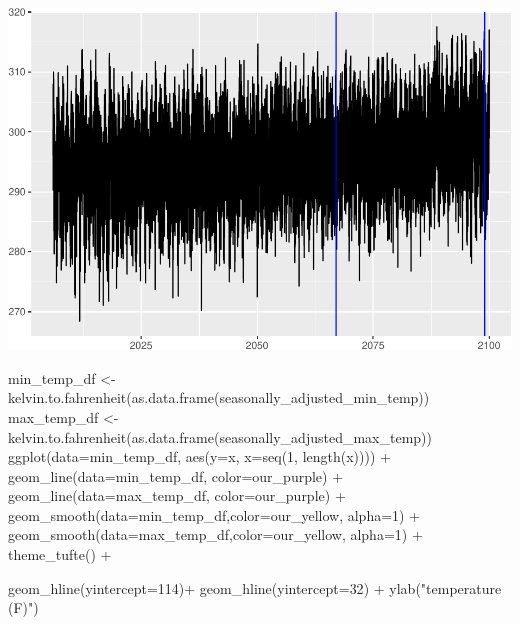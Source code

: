 \documentclass[
  paper=a4,
  ,captions=tableheading
]{scrartcl}
\newenvironment{Shaded}{\begin{snugshade}}{\end{snugshade}}
\newcommand{\AttributeTok}[1]{\textcolor[rgb]{0.77,0.63,0.00}{#1}}
\newcommand{\DecValTok}[1]{\textcolor[rgb]{0.00,0.00,0.81}{#1}}
\newcommand{\FunctionTok}[1]{\textcolor[rgb]{0.00,0.00,0.00}{#1}}
\newcommand{\NormalTok}[1]{#1}
\newcommand{\OtherTok}[1]{\textcolor[rgb]{0.56,0.35,0.01}{#1}}
\newcommand{\SpecialCharTok}[1]{\textcolor[rgb]{0.00,0.00,0.00}{#1}}
\newcommand{\StringTok}[1]{\textcolor[rgb]{0.31,0.60,0.02}{#1}}
\begin{document}
\includegraphics{Haskell_files/figure-latex/unnamed-chunk-72-1.pdf}

\begin{Shaded}
\begin{Highlighting}[]
\NormalTok{min\_temp\_df }\OtherTok{\textless{}{-}} \FunctionTok{kelvin.to.fahrenheit}\NormalTok{(}\FunctionTok{as.data.frame}\NormalTok{(seasonally\_adjusted\_min\_temp))}
\NormalTok{max\_temp\_df }\OtherTok{\textless{}{-}} \FunctionTok{kelvin.to.fahrenheit}\NormalTok{(}\FunctionTok{as.data.frame}\NormalTok{(seasonally\_adjusted\_max\_temp))}
\FunctionTok{ggplot}\NormalTok{(}\AttributeTok{data=}\NormalTok{min\_temp\_df, }\FunctionTok{aes}\NormalTok{(}\AttributeTok{y=}\NormalTok{x, }\AttributeTok{x=}\FunctionTok{seq}\NormalTok{(}\DecValTok{1}\NormalTok{, }\FunctionTok{length}\NormalTok{(x)))) }\SpecialCharTok{+} 
  \FunctionTok{geom\_line}\NormalTok{(}\AttributeTok{data=}\NormalTok{min\_temp\_df, }\AttributeTok{color=}\NormalTok{our\_purple) }\SpecialCharTok{+}
  \FunctionTok{geom\_line}\NormalTok{(}\AttributeTok{data=}\NormalTok{max\_temp\_df, }\AttributeTok{color=}\NormalTok{our\_purple) }\SpecialCharTok{+}
  \FunctionTok{geom\_smooth}\NormalTok{(}\AttributeTok{data=}\NormalTok{min\_temp\_df,}\AttributeTok{color=}\NormalTok{our\_yellow, }\AttributeTok{alpha=}\DecValTok{1}\NormalTok{) }\SpecialCharTok{+}
  \FunctionTok{geom\_smooth}\NormalTok{(}\AttributeTok{data=}\NormalTok{max\_temp\_df,}\AttributeTok{color=}\NormalTok{our\_yellow, }\AttributeTok{alpha=}\DecValTok{1}\NormalTok{) }\SpecialCharTok{+}
  \FunctionTok{theme\_tufte}\NormalTok{() }\SpecialCharTok{+}
  
  \FunctionTok{geom\_hline}\NormalTok{(}\AttributeTok{yintercept=}\DecValTok{114}\NormalTok{)}\SpecialCharTok{+}
  \FunctionTok{geom\_hline}\NormalTok{(}\AttributeTok{yintercept=}\DecValTok{32}\NormalTok{) }\SpecialCharTok{+} 
  \FunctionTok{ylab}\NormalTok{(}\StringTok{"temperature (F)"}\NormalTok{)}
\end{Highlighting}
\end{Shaded}
\end{document}
